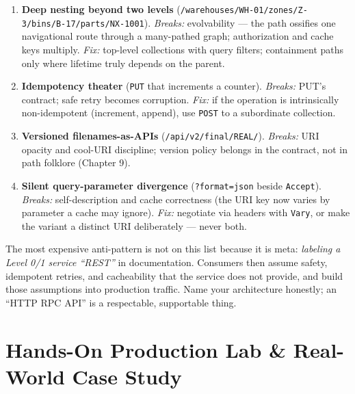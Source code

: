 \begin{enumerate}
        validators). \emph{Breaks:} cacheability --- intermediaries guess, and
        guessed caching is either absent (wasted scale) or wrong (stale data
        sold twice). \emph{Fix:} validators on every GET representation;
        explicit freshness policy, even if the policy is
        \texttt{no-cache} \cite{rfc9110}.
  \item \textbf{Deep nesting beyond two levels}
        (\texttt{/warehouses/WH-01/zones/Z-3/bins/B-17/parts/NX-1001}).
        \emph{Breaks:} evolvability --- the path ossifies one navigational
        route through a many-pathed graph; authorization and cache keys
        multiply. \emph{Fix:} top-level collections with query filters;
        containment paths only where lifetime truly depends on the parent.
  \item \textbf{Idempotency theater} (\texttt{PUT} that increments a counter).
        \emph{Breaks:} PUT's contract; safe retry becomes corruption.
        \emph{Fix:} if the operation is intrinsically non-idempotent
        (increment, append), use \texttt{POST} to a subordinate collection.
  \item \textbf{Versioned filenames-as-APIs} (\texttt{/api/v2/final/REAL/}).
        \emph{Breaks:} URI opacity and cool-URI discipline; version policy
        belongs in the contract, not in path folklore (Chapter 9).
  \item \textbf{Silent query-parameter divergence} (\texttt{?format=json}
        beside \texttt{Accept}). \emph{Breaks:} self-description and cache
        correctness (the URI key now varies by parameter a cache may ignore).
        \emph{Fix:} negotiate via headers with \texttt{Vary}, or make the
        variant a distinct URI deliberately --- never both.
\end{enumerate}

\begin{warningbox}
The most expensive anti-pattern is not on this list because it is meta:
\emph{labeling a Level 0/1 service ``REST''} in documentation. Consumers then
assume safety, idempotent retries, and cacheability that the service does not
provide, and build those assumptions into production traffic. Name your
architecture honestly; an ``HTTP RPC API'' is a respectable, supportable thing.
\end{warningbox}

\section{Hands-On Production Lab \& Real-World Case Study}
\label{sec:ch3-lab}

